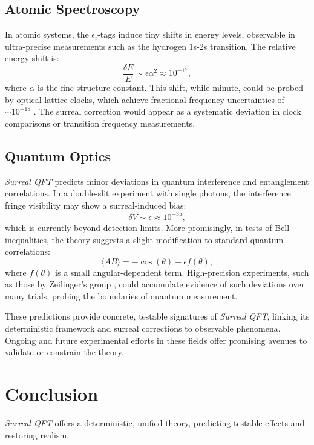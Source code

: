 \documentclass{article}
\begin{document}
\subsection{Atomic Spectroscopy}
In atomic systems, the \(\epsilon_i\)-tags induce tiny shifts in energy levels, observable in ultra-precise measurements such as the hydrogen 1s-2s transition. The relative energy shift is:
\begin{equation}
\frac{\delta E}{E} \sim \epsilon \alpha^2 \approx 10^{-17},
\end{equation}
where \(\alpha\) is the fine-structure constant. This shift, while minute, could be probed by optical lattice clocks, which achieve fractional frequency uncertainties of \(\sim 10^{-18}\) \cite{Ludlow2015}. The surreal correction would appear as a systematic deviation in clock comparisons or transition frequency measurements.

\subsection{Quantum Optics}
\textit{Surreal QFT} predicts minor deviations in quantum interference and entanglement correlations. In a double-slit experiment with single photons, the interference fringe visibility may show a surreal-induced bias:
\begin{equation}
\delta V \sim \epsilon \approx 10^{-35},
\end{equation}
which is currently beyond detection limits. More promisingly, in tests of Bell inequalities, the theory suggests a slight modification to standard quantum correlations:
\begin{equation}
\langle A B \rangle = -\cos(\theta) + \epsilon f(\theta),
\end{equation}
where \(f(\theta)\) is a small angular-dependent term. High-precision experiments, such as those by Zeilinger's group \cite{Zeilinger2017}, could accumulate evidence of such deviations over many trials, probing the boundaries of quantum measurement.

These predictions provide concrete, testable signatures of \textit{Surreal QFT}, linking its deterministic framework and surreal corrections to observable phenomena. Ongoing and future experimental efforts in these fields offer promising avenues to validate or constrain the theory.

\section{Conclusion}
\textit{Surreal QFT} offers a deterministic, unified theory, predicting testable effects and restoring realism.
\end{document}
